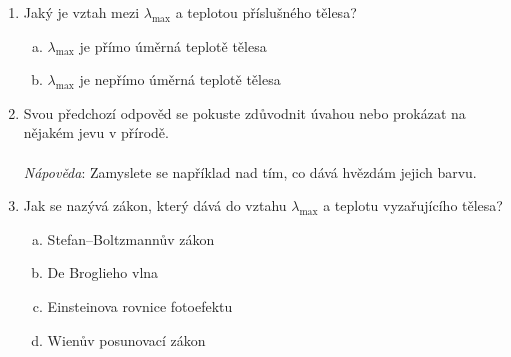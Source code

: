 \documentclass{../../../../style/mkimain}
\begin{document}
\begin{enumerate}
    \item Jaký je vztah mezi $\lambda_\mathrm{max}$ a teplotou příslušného tělesa?
    \begin{enumerate}[a)]
        \item $\lambda_\mathrm{max}$ je přímo úměrná teplotě tělesa
        \item $\lambda_\mathrm{max}$ je nepřímo úměrná teplotě tělesa
    \end{enumerate}
    \item Svou předchozí odpověd se pokuste zdůvodnit úvahou nebo prokázat na nějakém jevu v přírodě.
    \\\\
    \emph{Nápověda}: Zamyslete se například nad tím, co dává hvězdám jejich barvu.
    \item Jak se nazývá zákon, který dává do vztahu $\lambda_\mathrm{max}$ a teplotu vyzařujícího tělesa?
    \begin{enumerate}[a)]
        \item Stefan–Boltzmannův zákon
        \item De Broglieho vlna
        \item Einsteinova rovnice fotoefektu
        \item Wienův posunovací zákon
    \end{enumerate} 
\end{enumerate}
\end{document}
